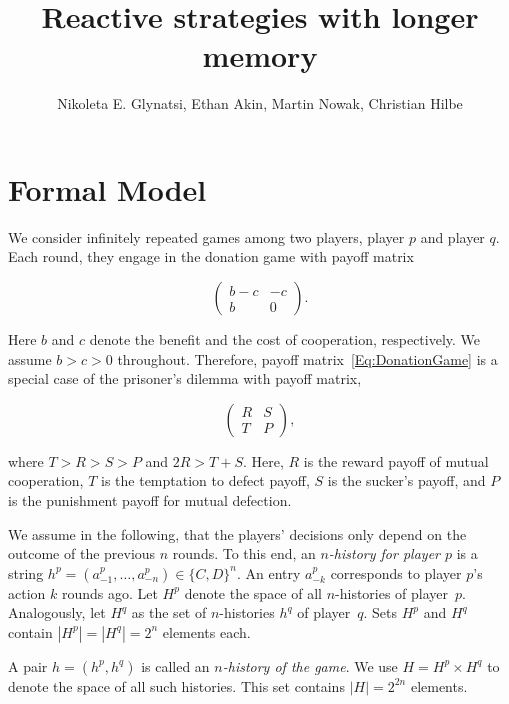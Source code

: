 \documentclass{article}
\title{Reactive strategies with longer memory}
\author{Nikoleta E. Glynatsi, Ethan Akin, Martin Nowak, Christian Hilbe}
\date{}
\theoremstyle{definition}
\begin{document}
\maketitle

\section{Formal Model}

We consider infinitely repeated games among two players, player $p$ and
player $q$. Each round, they engage in the donation game with payoff matrix

\begin{equation} \label{Eq:DonationGame}
\left(
\begin{array}{cc}
b-c	&-c\\
b	&0
\end{array}
\right).
\end{equation}

Here $b$ and $c$ denote the benefit and the cost of cooperation, respectively. 
We assume $b\!>\!c\!>\!0$ throughout.
Therefore, payoff matrix~\eqref{Eq:DonationGame} is a special case of the
prisoner's dilemma with payoff matrix,

\begin{equation} \label{Eq:PrisonerDilemma}
    \left(
    \begin{array}{cc}
    R & S\\
    T & P
    \end{array}
    \right),
\end{equation}

where $T > R > S > P$ and $2 R > T + S$. Here, $R$ is the reward payoff of mutual
cooperation, $T$ is the temptation to defect payoff, $S$ is the sucker's payoff,
and $P$ is the punishment payoff for mutual defection.

We assume in the following, that the players' decisions only depend on the
outcome of the previous $n$ rounds. To this end, an {\it $n$-history for player
$p$} is a string $h^p=(a^p_{-1},\ldots,a^p_{-n})\!\in\!\{C,D\}^n$. An entry
$a^p_{-k}$ corresponds to player $p$'s action $k$ rounds ago. Let $H^p$ denote
the space of all $n$-histories of player~$p$. Analogously, let $H^q$ as the set
of $n$-histories $h^q$ of player~$q$. Sets $H^p$ and $H^q$ contain
$|H^p|=|H^q|=2^{n}$ elements each.

A pair $h\!=\!(h^p,h^q)$ is called an {\it $n$-history of the game}. We use
$H=H^p\times H^q$ to denote the space of all such histories. This set contains
$|H|=2^{2n}$ elements.
\end{document}
